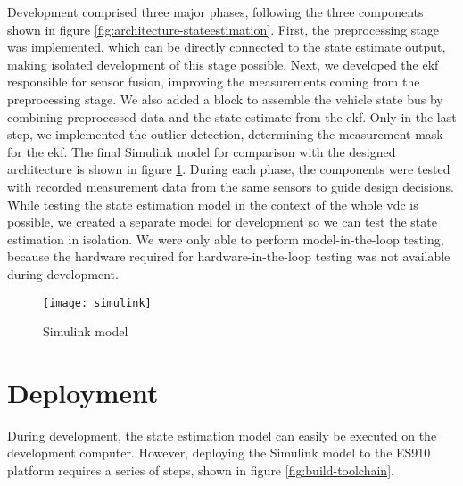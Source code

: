 Development comprised three major phases, following the three components shown in figure \ref{fig:architecture-stateestimation}. First, the preprocessing stage was implemented, which can be directly connected to the state estimate output, making isolated development of this stage possible. Next, we developed the \gls{ekf} responsible for sensor fusion, improving the measurements coming from the preprocessing stage. We also added a block to assemble the vehicle state bus by combining preprocessed data and the state estimate from the \gls{ekf}. Only in the last step, we implemented the outlier detection, determining the measurement mask for the \gls{ekf}. The final Simulink model for comparison with the designed architecture is shown in figure \ref{fig:simulink}. During each phase, the components were tested with recorded measurement data from the same sensors to guide design decisions. While testing the state estimation model in the context of the whole \gls{vdc} is possible, we created a separate model for development so we can test the state estimation in isolation. We were only able to perform model-in-the-loop testing, because the hardware required for hardware-in-the-loop testing was not available during development.

\begin{figure}
	\centering
	\texttt{[image: simulink]}%
	\caption{Simulink model}
	\label{fig:simulink}
\end{figure}


\section{Deployment}
During development, the state estimation model can easily be executed on the development computer. However, deploying the Simulink model to the ES910 platform requires a series of steps, shown in figure \ref{fig:build-toolchain}.

